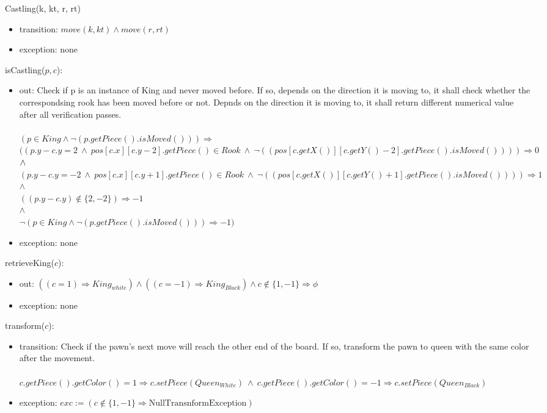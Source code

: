 \documentclass[12pt]{article}
\begin{document}
\noindent Castling(k, kt,  r, rt) {
\begin{itemize}
\item transition: $move(k, kt) \wedge move(r, rt)$
\item exception: none
\end{itemize}

\noindent isCastling($p, c$):
\begin{itemize}
\item out: Check if p is an instance of King and never moved before. If so, depends on the direction it is moving to, it shall check whether the correspondsing rook has been moved before or not. Depnds on the direction it is moving to, it shall return different numerical value after all verification passes.\\
\\
$(p \in King \wedge \neg(p.getPiece().isMoved())) \Rightarrow$\\
$((p.y-c.y = 2\ \wedge\  pos[c.x][c.y-2].getPiece() \in Rook\ \wedge \  \neg((pos[c.getX()][c.getY()-2].getPiece().isMoved()))) \Rightarrow 0$ \\
$\wedge \\ $
$(p.y-c.y = -2\ \wedge\  pos[c.x][c.y+1].getPiece() \in Rook\ \wedge \  \neg((pos[c.getX()][c.getY()+1].getPiece().isMoved()))) \Rightarrow 1$ \\
$\wedge$ \\ 
$((p.y - c.y) \not\in \{2,-2\}) \Rightarrow -1$ \\
$\wedge$ \\ 
$\neg (p \in King \wedge \neg(p.getPiece().isMoved())) \Rightarrow -1) $\\ 
\item exception:  none
\end{itemize}

\noindent retrieveKing($c$):
\begin{itemize}
\item out: $((c = 1) \Rightarrow King_{white}) \wedge ((c = -1) \Rightarrow King_{Black}) \wedge c \not\in \{1,-1\} \Rightarrow \phi$
\item exception: none
\end{itemize}

\noindent transform($c$):
\begin{itemize}
\item transition: Check if the pawn's next move will reach the other end of the board. If so, transform the pawn to queen with the same color after the movement. \\
\\
$c.getPiece().getColor() = 1 \Rightarrow c.setPiece(Queen_{White})\  \wedge \  c.getPiece().getColor() = -1 \Rightarrow c.setPiece(Queen_{Black})$
\item exception: $exc := (c \not\in \{1,-1\} \Rightarrow \mathrm{NullTransnformException})$
\end{itemize}

}
\end{document}
